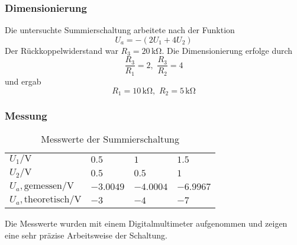 \subsubsection{Dimensionierung}
Die untersuchte Summierschaltung arbeitete nach der Funktion
\[U_a = -(2 U_1 + 4 U_2)\]
Der Rückkoppelwiderstand war $R_3 = 20 \, \si{\kilo\ohm}$. Die Dimensionierung
erfolge durch
\[\frac{R_3}{R_1} = 2, \,\, \frac{R_3}{R_2} = 4\]
und ergab
\[R_1 = 10 \, \si{\kilo\ohm}, \,\, R_2 = 5 \, \si{\kilo\ohm}\]

\subsubsection{Messung}
\begin{table}[H]
  \begin{center}
\begin{tabular}{@{}llll@{}}
\rowcolor{gray1} 
$U_1 / \si{\volt}$                                               & $0.5$     & $1$       & $1.5$     \\
\rowcolor{gray1} 
$U_2 / \si{\volt}$                                               & $0.5$     & $0.5$     & $1$       \\
\cellcolor{gray1}$U_a, \textrm{gemessen} / \si{\volt}$    & $-3.0049$ & $-4.0004$ & $-6.9967$ \\
  \cellcolor{gray1}$U_a, \textrm{theoretisch} / \si{\volt}$ & $-3$      & $-4$      & $-7$     
\end{tabular}
  \end{center}
  \caption{Messwerte der Summierschaltung}
\end{table}

Die Messwerte wurden mit einem Digitalmultimeter aufgenommen und zeigen eine sehr präzise Arbeitsweise der Schaltung.